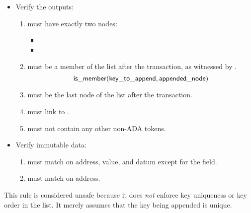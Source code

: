 \documentclass[../midgard.tex]{subfiles}
\begin{document}
\begin{description}
\begin{itemize}
            \item Verify the outputs:
            \begin{enumerate}[resume]
                \item {} must have exactly two nodes:
                    \begin{itemize}
                        \item {}
                        \item {}  
                    \end{itemize}
                \item {} must be a member of the list after the transaction, as witnessed by .
                    \begin{equation*}
                        \mathsf{is\_member} (\mathsf{key\_to\_append}, \mathsf{appended\_node})
                    \end{equation*}
                \item {} must be the last node of the list after the transaction.
                \item {} must link to .
                \item {} must not contain any other non-ADA tokens.
            \end{enumerate}
            
            \item Verify immutable data:
            \begin{enumerate}[resume]
                \item {} must match  on address, value, and datum except for the  field.
                \item {} must match  on address.
            \end{enumerate}
        \end{itemize}

    This rule is considered unsafe because it does \emph{not} enforce key uniqueness or key order in the list.
    It merely assumes that the key being appended is unique.

    \unorderedListWarning 


\end{description}
\end{document}
